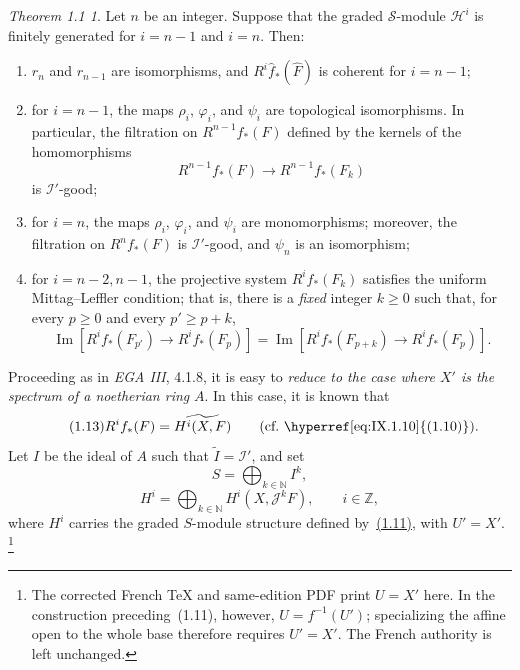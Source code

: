 \documentclass[11pt,a4paper,oneside]{book}
\theoremstyle{plain}
\theoremstyle{definition}
\theoremstyle{remark}
\newtheorem*{theoremIXoneone}{Theorem 1.1}
\begin{document}
\begin{theoremIXoneone}
Let $n$ be an integer. Suppose that the graded $\mathcal S$-module
$\mathcal H^i$ is finitely generated for $i=n-1$ and $i=n$. Then:
\begin{enumerate}
\renewcommand{\labelenumi}{(\arabic{enumi})}
\setcounter{enumi}{-1}
\item
$r_n$ and $r_{n-1}$ are isomorphisms, and
$R^i\widehat f_*(\widehat F)$ is coherent for $i=n-1$;

\item
for $i=n-1$, the maps $\rho_i$, $\varphi_i$, and $\psi_i$ are topological
isomorphisms. In particular, the filtration on $R^{n-1}f_*(F)$ defined by
the kernels of the homomorphisms
\begin{equation}
\tag{1.12}\label{eq:IX.1.12}
R^{n-1}f_*(F)\longrightarrow R^{n-1}f_*(F_k)
\end{equation}
is $\mathcal I'$-good;

\item
for $i=n$, the maps $\rho_i$, $\varphi_i$, and $\psi_i$ are monomorphisms;
moreover, the filtration on $R^n f_*(F)$ is $\mathcal I'$-good, and $\psi_n$
is an isomorphism;

\item
for $i=n-2,n-1$, the projective system $R^i f_*(F_k)$ satisfies the uniform
Mittag--Leffler condition; that is, there is a \emph{fixed} integer $k\geq0$
such that, for every $p\geq0$ and every $p'\geq p+k$,
\[
\operatorname{Im}\!\left[R^i f_*(F_{p'})\longrightarrow R^i f_*(F_p)\right]
=
\operatorname{Im}\!\left[R^i f_*(F_{p+k})\longrightarrow R^i f_*(F_p)\right].
\]
\end{enumerate}
\end{theoremIXoneone}

Proceeding as in \emph{EGA III}, 4.1.8, it is easy to \emph{reduce to the case
where $X'$ is the spectrum of a noetherian ring} $A$. In this case, it is
known that
\begin{equation}
\tag{1.13}\label{eq:IX.1.13}
R^i f_*(F)=\widetilde{H^i(X,F)}
\qquad\text{(cf.~\hyperref[eq:IX.1.10]{(1.10)}).}
\end{equation}
Let $I$ be the ideal of $A$ such that $\widetilde I=\mathcal I'$, and set
\begin{equation}
\tag{1.14}\label{eq:IX.1.14}
S=\bigoplus_{k\in\mathbb N}I^k,
\end{equation}
\begin{equation}
\tag{1.15}\label{eq:IX.1.15}
H^i=\bigoplus_{k\in\mathbb N}H^i(X,\mathcal J^kF),
\qquad i\in\mathbb Z,
\end{equation}
where $H^i$ carries the graded $S$-module structure defined by~\hyperref[eq:IX.1.11]{(1.11)}, with
$U'=X'$.
\footnote{The corrected French TeX and same-edition PDF print $U=X'$ here.
In the construction preceding~(1.11), however, $U=f^{-1}(U')$; specializing
the affine open to the whole base therefore requires $U'=X'$. The French
authority is left unchanged.}
\end{document}
